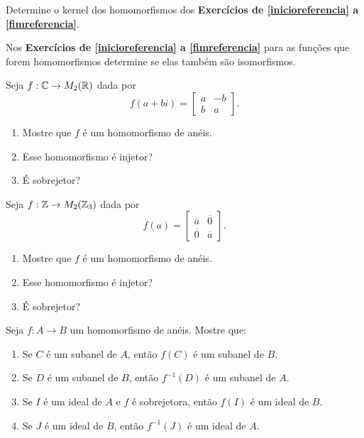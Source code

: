 \documentclass[12pt]{exam}
\begin{document}
\vspace{.3cm}

\questao{} Determine o kernel dos homomorfismos dos \textbf{Exercícios de \ref{inicioreferencia} a \ref{fimreferencia}}.

\vspace{.3cm}

\questao{} Nos \textbf{Exercícios de \ref{inicioreferencia} a \ref{fimreferencia}} para as funções que forem homomorfismos determine se elas também são isomorfismos.

\vspace{.3cm}

\questao{} Seja $f : \mathbb{C} \to M_2(\mathbb{R})$ dada por
\[
f(a + bi) = \begin{bmatrix}
    a & -b\\
    b & a
\end{bmatrix}.
\]
\begin{enumerate}[label=({\alph*})]
    \item Mostre que $f$ é um homomorfismo de anéis.

    \item Esse homomorfismo é injetor?

    \item É sobrejetor?
\end{enumerate}

\vspace{.3cm}

\questao{} Seja $f : \mathbb{Z} \to M_2(\mathbb{Z}_3)$ dada por
\[
f(a) = \begin{bmatrix}
    \overline{a} & \overline{0}\\
    \overline{0} & \overline{a}
\end{bmatrix}.
\]
\begin{enumerate}[label=({\alph*})]
    \item Mostre que $f$ é um homomorfismo de anéis.

    \item Esse homomorfismo é injetor?

    \item É sobrejetor?
\end{enumerate}

\vspace{.3cm}

\questao{} Seja $f: A \to B$ um homomorfismo de anéis. Mostre que:
\begin{enumerate}[label=({\alph*})]
    \item Se $C$  é um subanel de $A$, então $f(C)$ é um subanel de $B$.

    \item Se $D$ é um subanel de $B$, então $f^{-1}(D)$ é um subanel de $A$.

    \item Se $I$ é um ideal de $A$ e $f$ é sobrejetora, então $f(I)$ é um ideal de $B$.

    \item Se $J$ é um ideal de $B$, então $f^{-1}(J)$ é um ideal de $A$.
\end{enumerate}
\end{document}
